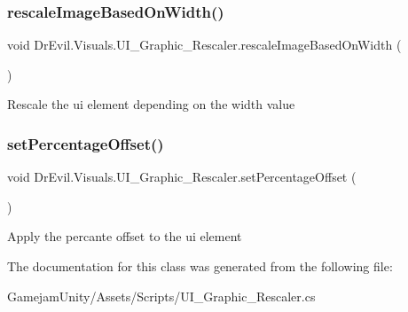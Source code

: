 \subsubsection{\texorpdfstring{rescale\+Image\+Based\+On\+Width()}{rescaleImageBasedOnWidth()}}
{\footnotesize\ttfamily void Dr\+Evil.\+Visuals.\+U\+I\+\_\+\+Graphic\+\_\+\+Rescaler.\+rescale\+Image\+Based\+On\+Width (\begin{DoxyParamCaption}{ }\end{DoxyParamCaption})\hspace{0.3cm}{\ttfamily [inline]}}



Rescale the ui element depending on the width value 

\mbox{\label{class_dr_evil_1_1_visuals_1_1_u_i___graphic___rescaler_a8b851fe76ba2a6d41b0b156baa274251}} 
\subsubsection{\texorpdfstring{set\+Percentage\+Offset()}{setPercentageOffset()}}
{\footnotesize\ttfamily void Dr\+Evil.\+Visuals.\+U\+I\+\_\+\+Graphic\+\_\+\+Rescaler.\+set\+Percentage\+Offset (\begin{DoxyParamCaption}{ }\end{DoxyParamCaption})\hspace{0.3cm}{\ttfamily [inline]}}



Apply the percante offset to the ui element 



The documentation for this class was generated from the following file\+:\begin{DoxyCompactItemize}
\item 
Gamejam\+Unity/\+Assets/\+Scripts/U\+I\+\_\+\+Graphic\+\_\+\+Rescaler.\+cs\end{DoxyCompactItemize}
